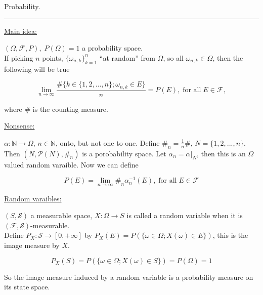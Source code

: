 \documentclass[12pt]{article}
\newcommand{\pset}[1]{ \mathcal{P}(#1) }
\newcommand{\rarw}[0] { \rightarrow }
\newcommand{\nats}[0] { \mathbb{N}}
\newcommand{\om}[0] { \omega }
\newcommand{\Om}[0] { \Omega }
\newcommand{\F}[0] { \mathcal{F} }
\newcommand{\cS}[0] { \mathcal{S} }
\begin{document}
\break

\begin{flushleft}
Probability. 
\end{flushleft}

\begin{flushleft}
\addvspace{5pt} \hrule
\end{flushleft}	



\begin{flushleft}
\underline{Main idea:}
\end{flushleft}


$ (\Om, \F, P ), \;  P(\Om)=1 $ a probability space.\\


If picking $n$ points, $\{ \om_{n,k}\}_{k=1}^n$ ``at random'' from $\Om$, so all $ \om_{n,k} \in \Om$, then the following will be true

$$
	\lim_{n \rarw \infty } \frac{ \#\{ k \in \{ 1,2,...,n\} ; \om_{n,k} \in E \} }{n} = P(E), \; \textrm{for all} \; E \in \F,
$$

where $\#$ is the counting measure. \\

\begin{flushleft}
\underline{Nonsense:}
\end{flushleft}

 $\alpha:  \nats \rarw \Om$, $n \in \nats$, onto, but not one to one. Define $\#_n = \frac{1}{n} \# $, $N = \{ 1,2,...,n \}$. Then $(N, \pset{N}, \#_n )$ is a porobability space. Let $\alpha_n = \alpha |_N$, then this is an $\Om$ valued random varaible. Now we can define

$$
	P(E) = \lim_{n \rarw \infty} \#_n \alpha_n^{-1} (E), \; \textrm{for all} \; E \in \F
$$




\begin{flushleft}
\underline{Random varaibles:}
\end{flushleft}

$(S, \cS)$ a measurable space, $X: \Om \rarw S $ is called a random variable when it is $(\F, \cS)$-measurable. \\

Define $P_X: \cS \rarw [0,+\infty]$ by $P_X(E) = P( \{ \om \in \Om; X(\om) \in E \})$, this is the image measure by $X$.

$$
	P_X(S) = P( \{  \om \in \Om; X(\om) \in S \} ) = P( \Om ) = 1
$$

So the image measure induced by a random variable is a probability measure on its state space. \\
\end{document}
